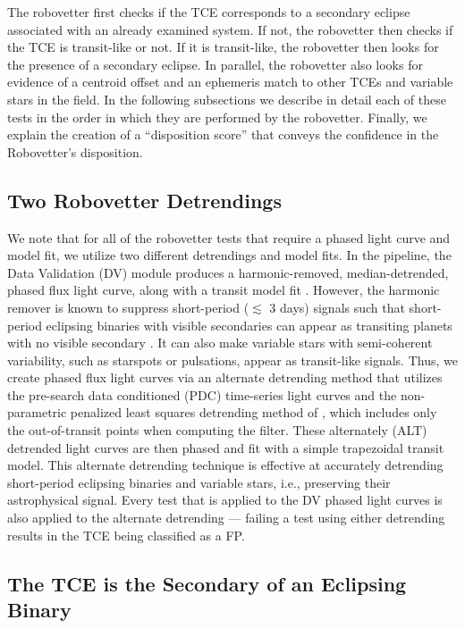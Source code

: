 The robovetter first checks if the TCE corresponds to a secondary eclipse associated with an already examined system. If not, the robovetter then checks if the TCE is transit-like or not. If it is transit-like, the robovetter then looks for the presence of a secondary eclipse. In parallel, the robovetter also looks for evidence of a centroid offset and an ephemeris match to other TCEs and variable stars in the \kepler{} field. In the following subsections we describe in detail each of these tests in the order in which they are performed by the robovetter. Finally, we explain the creation of a ``disposition score'' that conveys the confidence in the Robovetter's disposition.


\subsection{Two Robovetter Detrendings}
We note that for all of the robovetter tests that require a phased light curve and model fit, we utilize two different detrendings and model fits. In the \kepler{} pipeline, the Data Validation (DV) module produces a harmonic-removed, median-detrended, phased flux light curve, along with a transit model fit \citep{Wu2010}. However, the harmonic remover is known to suppress short-period ($\lesssim$ 3 days) signals such that short-period eclipsing binaries with visible secondaries can appear as transiting planets with no visible secondary \citep{Christiansen2013b}. It can also make variable stars with semi-coherent variability, such as starspots or pulsations, appear as transit-like signals. Thus, we create phased flux light curves via an alternate detrending method that utilizes the pre-search data conditioned (PDC) time-series light curves and the non-parametric penalized least squares detrending method of \citet{Garcia2010}, which includes only the out-of-transit points when computing the filter. These alternately (ALT) detrended light curves are then phased and fit with a simple trapezoidal transit model. This alternate detrending technique is effective at accurately detrending short-period eclipsing binaries and variable stars, i.e., preserving their astrophysical signal. Every test that is applied to the DV phased light curves is also applied to the alternate detrending --- failing a test using either detrending results in the TCE being classified as a FP.

\subsection{The TCE is the Secondary of an Eclipsing Binary}

